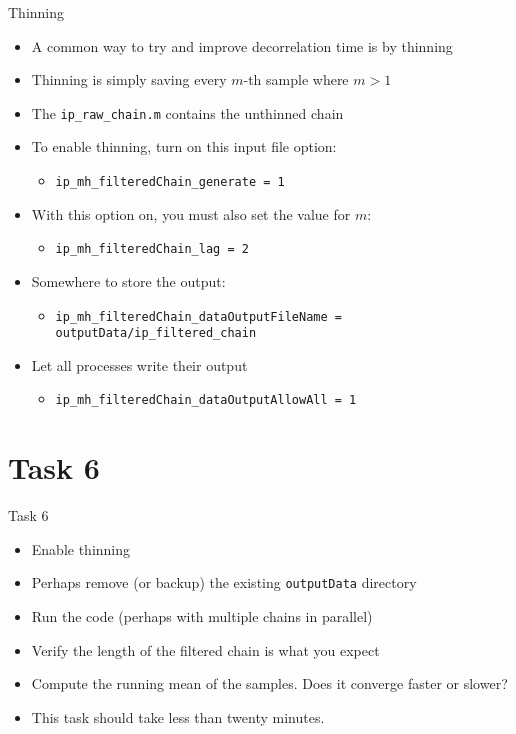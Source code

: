 \begin{frame}[fragile]{Thinning}
  \begin{itemize}
    \item A common way to try and improve decorrelation time is by thinning
    \item Thinning is simply saving every $m$-th sample where $m > 1$
    \item The \texttt{ip\_raw\_chain.m} contains the unthinned chain
    \item To enable thinning, turn on this input file option:
      \begin{itemize}
        \item \texttt{ip\_mh\_filteredChain\_generate = 1}
      \end{itemize}
    \item With this option on, you must also set the value for $m$:
      \begin{itemize}
        \item \texttt{ip\_mh\_filteredChain\_lag = 2}
      \end{itemize}
    \item Somewhere to store the output:
      \begin{itemize}
        \item \texttt{ip\_mh\_filteredChain\_dataOutputFileName = outputData/ip\_filtered\_chain}
      \end{itemize}
    \item Let all processes write their output
      \begin{itemize}
        \item \texttt{ip\_mh\_filteredChain\_dataOutputAllowAll = 1}
      \end{itemize}
  \end{itemize}
\end{frame}

\section{Task 6}
\begin{frame}[fragile]{Task 6}
  \begin{itemize}
    \item Enable thinning
    \item Perhaps remove (or backup) the existing \texttt{outputData} directory
    \item Run the code (perhaps with multiple chains in parallel)
    \item Verify the length of the filtered chain is what you expect
    \item Compute the running mean of the samples.  Does it converge faster
      or slower?
    \item This task should take less than twenty minutes.
  \end{itemize}
\end{frame}
